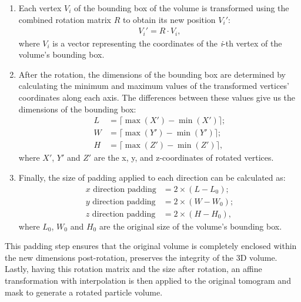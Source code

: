 \documentclass[preprint,12pt]{elsarticle}
\begin{document}
\begin{enumerate}
    \item Each vertex \( V_i \) of the bounding box of the volume is transformed using the combined rotation matrix \( R \) to obtain its new position \( V_i' \):
    \begin{align}
        V_i' = R \cdot V_i,
    \end{align}
    where \( V_i \) is a vector representing the coordinates of the \textit{i}-th vertex of the volume's bounding box. 
    \item After the rotation, the dimensions of the bounding box are determined by calculating the minimum and maximum values of the transformed vertices' coordinates along each axis. 
    The differences between these values give us the dimensions of the bounding box:
    \begin{align}
    L &= \lceil \max(X') - \min(X') \rceil; \\
    W &= \lceil \max(Y') - \min(Y') \rceil; \\
    H &= \lceil \max(Z') - \min(Z') \rceil, 
    \end{align}
    where $X'$, $Y'$ and $Z'$ are the x, y, and z-coordinates of rotated vertices.
    \item Finally, the size of padding applied to each direction can be calculated as:
    \begin{align}
        \text{$x$ direction padding} &= 2 \times (L - L_0); \\
        \text{$y$ direction padding} &= 2 \times (W - W_0); \\
        \text{$z$ direction padding} &= 2 \times (H - H_0),
    \end{align}
    where $L_0$, $W_0$ and $H_0$ are the original size of the volume's bounding box.
\end{enumerate}
This padding step ensures that the original volume is completely enclosed within the new dimensions post-rotation, preserves the integrity of the 3D volume.
Lastly, having this rotation matrix and the size after rotation, an affine transformation with interpolation is then applied to the original tomogram and mask to generate a rotated particle volume. 

\end{document}
